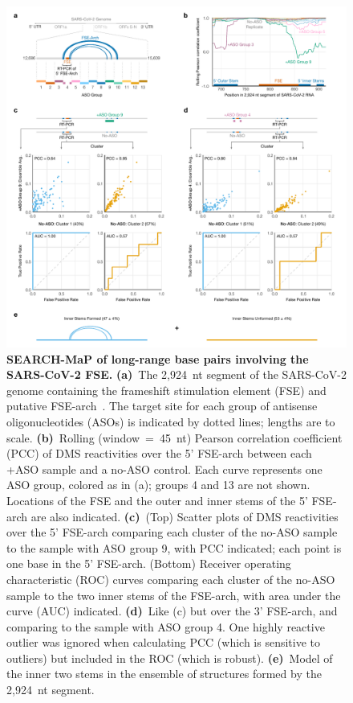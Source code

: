 \documentclass[main.tex]{subfiles}
\begin{document}
\begin{figure}[H]
	\includegraphics[width=\textwidth]{../MainFigures/sars2-tile/sars2-tile.pdf}
	\caption{\textbf{SEARCH-MaP of long-range base pairs involving the SARS-CoV-2 FSE.} \textbf{(a)}~The 2,924~nt segment of the SARS-CoV-2 genome containing the frameshift stimulation element (FSE) and putative FSE-arch~\cite{Ziv2020}. The target site for each group of antisense oligonucleotides (ASOs) is indicated by dotted lines; lengths are to scale. \textbf{(b)}~Rolling (window~=~45~nt) Pearson correlation coefficient (PCC) of DMS reactivities over the 5' FSE-arch between each +ASO sample and a no-ASO control. Each curve represents one ASO group, colored as in (a); groups 4 and 13 are not shown. Locations of the FSE and the outer and inner stems of the 5' FSE-arch are also indicated. \textbf{(c)}~(Top) Scatter plots of DMS reactivities over the 5' FSE-arch comparing each cluster of the no-ASO sample to the sample with ASO group 9, with PCC indicated; each point is one base in the 5' FSE-arch. (Bottom) Receiver operating characteristic (ROC) curves comparing each cluster of the no-ASO sample to the two inner stems of the FSE-arch, with area under the curve (AUC) indicated. \textbf{(d)}~Like (c) but over the 3' FSE-arch, and comparing to the sample with ASO group 4. One highly reactive outlier was ignored when calculating PCC (which is sensitive to outliers) but included in the ROC (which is robust). \textbf{(e)}~Model of the inner two stems in the ensemble of structures formed by the 2,924~nt segment.}
	\label{tiles}
\end{figure}
\end{document}
